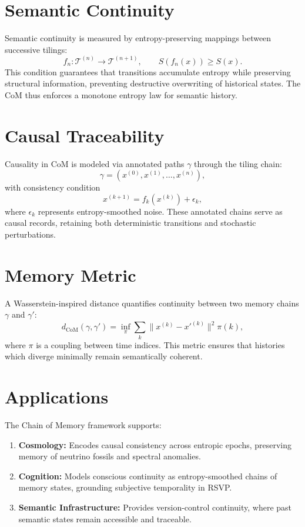 \documentclass[12pt]{report}
\begin{document}
\section{Semantic Continuity}

Semantic continuity is measured by entropy-preserving mappings between successive tilings:
\[
f_n : \mathcal{T}^{(n)} \to \mathcal{T}^{(n+1)}, \qquad 
S(f_n(x)) \geq S(x).
\]
This condition guarantees that transitions accumulate entropy while preserving structural information, preventing destructive overwriting of historical states.  
The CoM thus enforces a monotone entropy law for semantic history.

\section{Causal Traceability}

Causality in CoM is modeled via annotated paths $\gamma$ through the tiling chain:
\[
\gamma = (x^{(0)}, x^{(1)}, \dots, x^{(n)}),
\]
with consistency condition
\[
x^{(k+1)} = f_k(x^{(k)}) + \epsilon_k,
\]
where $\epsilon_k$ represents entropy-smoothed noise.  
These annotated chains serve as causal records, retaining both deterministic transitions and stochastic perturbations.

\section{Memory Metric}

A Wasserstein-inspired distance quantifies continuity between two memory chains $\gamma$ and $\gamma'$:
\begin{equation}
d_{\text{CoM}}(\gamma, \gamma') = \inf_{\pi} \sum_{k} \|x^{(k)} - x'^{(k)}\|^2 \pi(k),
\end{equation}
where $\pi$ is a coupling between time indices.  
This metric ensures that histories which diverge minimally remain semantically coherent.

\section{Applications}

The Chain of Memory framework supports:

\begin{enumerate}
    \item \textbf{Cosmology:} Encodes causal consistency across entropic epochs, preserving memory of neutrino fossils and spectral anomalies.  
    \item \textbf{Cognition:} Models conscious continuity as entropy-smoothed chains of memory states, grounding subjective temporality in RSVP.  
    \item \textbf{Semantic Infrastructure:} Provides version-control continuity, where past semantic states remain accessible and traceable.  
\end{enumerate}
\end{document}
